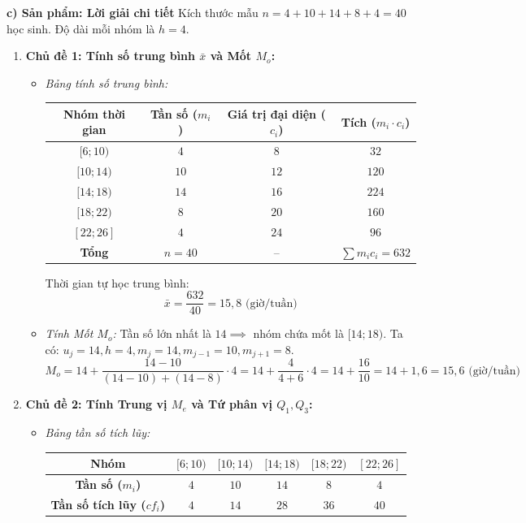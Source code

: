 \documentclass[12pt, a4paper]{article}
\begin{document}
\noindent \textbf{c) Sản phẩm: Lời giải chi tiết}
Kích thước mẫu $n = 4 + 10 + 14 + 8 + 4 = 40$ học sinh. Độ dài mỗi nhóm là $h = 4$.
\begin{enumerate}[leftmargin=0.6cm]
    \item \textbf{Chủ đề 1: Tính số trung bình $\bar{x}$ và Mốt $M_o$:}
    \begin{itemize}
        \item \textit{Bảng tính số trung bình:}
        \begin{center}
        \small
        \begin{tabular}{|c|c|c|c|}
        \hline
        \textbf{Nhóm thời gian} & \textbf{Tần số ($m_i$)} & \textbf{Giá trị đại diện ($c_i$)} & \textbf{Tích ($m_i \cdot c_i$)} \\ \hline
        $[6; 10)$ & $4$ & $8$ & $32$ \\ \hline
        $[10; 14)$ & $10$ & $12$ & $120$ \\ \hline
        $[14; 18)$ & $14$ & $16$ & $224$ \\ \hline
        $[18; 22)$ & $8$ & $20$ & $160$ \\ \hline
        $[22; 26]$ & $4$ & $24$ & $96$ \\ \hline
        \textbf{Tổng} & $n = 40$ & -- & $\sum m_i c_i = 632$ \\ \hline
        \end{tabular}
        \end{center}
        Thời gian tự học trung bình:
        $$\bar{x} = \dfrac{632}{40} = 15{,}8\text{ (giờ/tuần)}$$

        \item \textit{Tính Mốt $M_o$:}
        Tần số lớn nhất là $14 \implies$ nhóm chứa mốt là $[14; 18)$.
        Ta có: $u_j = 14, h = 4, m_j = 14, m_{j-1} = 10, m_{j+1} = 8$.
        $$M_o = 14 + \dfrac{14 - 10}{(14 - 10) + (14 - 8)} \cdot 4 = 14 + \dfrac{4}{4 + 6} \cdot 4 = 14 + \dfrac{16}{10} = 14 + 1{,}6 = 15{,}6\text{ (giờ/tuần)}$$
    \end{itemize}

    \item \textbf{Chủ đề 2: Tính Trung vị $M_e$ và Tứ phân vị $Q_1, Q_3$:}
    \begin{itemize}
        \item \textit{Bảng tần số tích lũy:}
        \begin{center}
        \small
        \begin{tabular}{|c|c|c|c|c|c|}
        \hline
        \textbf{Nhóm} & $[6; 10)$ & $[10; 14)$ & $[14; 18)$ & $[18; 22)$ & $[22; 26]$ \\ \hline
        \textbf{Tần số ($m_i$)} & $4$ & $10$ & $14$ & $8$ & $4$ \\ \hline
        \textbf{Tần số tích lũy ($cf_i$)} & $4$ & $14$ & $28$ & $36$ & $40$ \\ \hline
        \end{tabular}
        \end{center}


\end{itemize}
\end{enumerate}
\end{document}
